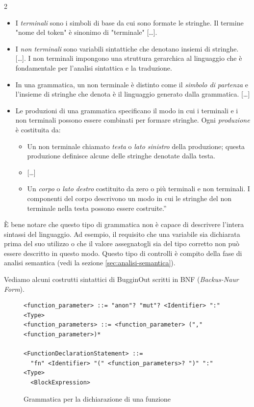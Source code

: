 \begin{parcolumns}[colwidths={1=0.44\textwidth,2=0.44\textwidth},rulebetween=true,nofirstindent=true,sloppy=true]{2}
{		\begin{itemize}
			\item I \emph{terminali} sono i simboli di base da cui sono formate le stringhe. Il termine "nome del token" \`e sinonimo di "terminale" [\ldots].
			\item I \emph{non terminali} sono variabili sintattiche che denotano insiemi di stringhe. [\ldots]. I non terminali impongono una struttura gerarchica al linguaggio che \`e fondamentale per l'analisi sintattica e la traduzione.
			\item In una grammatica, un non terminale \`e distinto come il \emph{simbolo di partenza} e l'insieme di stringhe che denota \`e il linguaggio generato dalla grammatica. [\ldots]
			\item Le produzioni di una grammatica specificano il modo in cui i terminali e i non terminali possono essere combinati per formare stringhe. Ogni \emph{produzione} \`e costituita da:
			\begin{itemize}
				\item Un non terminale chiamato \emph{testa} o \emph{lato sinistro} della produzione; questa produzione definisce alcune delle stringhe denotate dalla testa.
				\item{} [\ldots]
				\item Un \emph{corpo} o \emph{lato destro} costituito da zero o pi\`u terminali e non terminali. I componenti del corpo descrivono un modo in cui le stringhe del non terminale nella testa possono essere costruite.''
			\end{itemize}
		\end{itemize}
	}
	\colplacechunks
\end{parcolumns}

\`E bene notare che questo tipo di grammatica non \`e capace di descrivere l'intera sintassi del linguaggio. Ad esempio, il requisito che una variabile sia dichiarata prima del suo utilizzo o che il valore assegnatogli sia del tipo corretto non pu\`o essere descritto in questo modo. Questo tipo di controlli \`e compito della fase di analisi semantica (vedi la sezione \ref{sec:analisi-semantica}).

Vediamo alcuni costrutti sintattici di BugginOut scritti in BNF (\textit{Backus-Naur Form}).

\begin{figure}[H]
	\centering
	\begin{verbatim}
<function_parameter> ::= "anon"? "mut"? <Identifier> ":" <Type>
<function_parameters> ::= <function_parameter> ("," <function_parameter>)*

<FunctionDeclarationStatement> ::=
  "fn" <Identifier> "(" <function_parameters>? ")" ":" <Type>
  <BlockExpression>
  \end{verbatim}
	\caption{Grammatica per la dichiarazione di una funzione}
	\label{fig:bugginout-function-declaration}
\end{figure}


